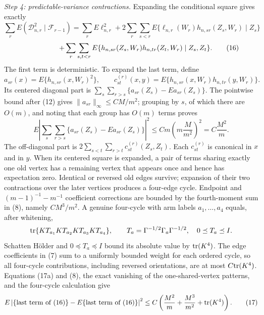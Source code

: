 \emph{Step 4: predictable-variance contractions.}
Expanding the conditional square gives exactly
\[
\sum_rE(\mathcal D_{n,r}^2\mid\mathcal F_{r-1})
=\sum_rE\ell_{n,r}^2
+2\sum_r\sum_{s<r}E\{\ell_{n,r}(W_r)h_{n,sr}(Z_s,W_r)\mid Z_s\}
\]
\[
\hspace{18mm}
+\sum_r\sum_{s,t<r}E\{h_{n,sr}(Z_s,W_r)h_{n,tr}(Z_t,W_r)\mid Z_s,Z_t\}. \tag{16}
\]
The first term is deterministic.  To expand the last term, define
\[
a_{sr}(x)=E\{h_{n,sr}(x,W_r)^2\},
\qquad
c_{st}^{(r)}(x,y)=E\{h_{n,sr}(x,W_r)h_{n,tr}(y,W_r)\}.
\]
Its centered diagonal part is \(\sum_s\sum_{r>s}\{a_{sr}(Z_s)-Ea_{sr}(Z_s)\}\).  The pointwise bound after (12) gives \(\|a_{sr}\|_\infty\le CM/m^2\); grouping by \(s\), of which there are \(O(m)\), and noting that each group has \(O(m)\) terms proves
\[
E\left|\sum_s\sum_{r>s}\{a_{sr}(Z_s)-Ea_{sr}(Z_s)\}\right|^2
\le C m\left(m\frac{M}{m^2}\right)^2=C\frac{M^2}{m}.        \tag{17a}
\]
The off-diagonal part is \(2\sum_{s<t}\sum_{r>t}c_{st}^{(r)}(Z_s,Z_t)\).  Each \(c_{st}^{(r)}\) is canonical in \(x\) and in \(y\).  When its centered square is expanded, a pair of terms sharing exactly one old vertex has a remaining vertex that appears once and hence has expectation zero.  Identical or reversed old edges survive; expansion of their two contractions over the later vertices produces a four-edge cycle.  Endpoint and \((m-1)^{-1}-m^{-1}\) coefficient corrections are bounded by the fourth-moment sum in (8), namely \(CM^3/m^2\).  A genuine four-cycle with arm labels \(a_1,\ldots,a_4\) equals, after whitening,
\[
{\rm tr}\{K T_{a_1}K T_{a_2}K T_{a_3}K T_{a_4}\},
\qquad
T_a=\Gamma^{-1/2}\Gamma_a\Gamma^{-1/2},\quad0\preceq T_a\preceq I.
\]
Schatten H\"older and \(0\preceq T_a\preceq I\) bound its absolute value by \({\rm tr}(K^4)\).  The edge coefficients in (7) sum to a uniformly bounded weight for each ordered cycle, so all four-cycle contributions, including reversed orientations, are at most \(C{\rm tr}(K^4)\).  Equations (17a) and (8), the exact vanishing of the one-shared-vertex patterns, and the four-cycle calculation give
\[
E\left|\{\text{last term of (16)}\}
-E\{\text{last term of (16)}\}\right|^2
\le C\left(\frac{M^2}{m}+\frac{M^3}{m^2}+{\rm tr}(K^4)\right). \tag{17}
\]

